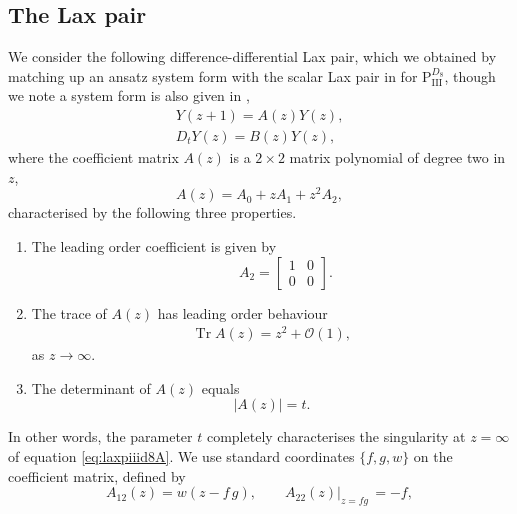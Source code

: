 \documentclass[a4paper,reqno]{amsart}
\numberwithin{equation}{section}
\numberwithin{figure}{section}
\theoremstyle{remark}
\newcommand\Pthree{\textrm{P}_{\textrm{III}}}
\begin{document}
\subsection{The Lax pair} \label{subsect:linP3d8}
We consider the following difference-differential Lax pair, which we obtained by matching up an ansatz system form with the scalar Lax pair in \cite{KNY2017} for $\Pthree^{D_8}$, though we note a system form is also given in \cite[\S 6]{adler94},
\begin{subequations}\label{eq:laxpiiid8}
\begin{align}
    Y(z+1)=A(z)Y(z),\label{eq:laxpiiid8A}\\
    D_t Y(z)=B(z)Y(z),\label{eq:laxpiiid8B}
\end{align}
\end{subequations}
where the coefficient matrix $A(z)$ is a $2\times 2$ matrix polynomial of degree two in $z$,
\begin{equation}\label{eq:piiid8Aseries}
        A(z)=A_0+z A_1+z^2A_2,
    \end{equation}
    characterised by the following three properties.
\begin{enumerate}[label=(\roman*)]
\item The leading order coefficient is given by
\begin{equation*}
    \qquad A_2=\begin{bmatrix}
            1 & 0\\
            0 & 0
        \end{bmatrix}.
\end{equation*}
    \item The trace of $A(z)$ has leading order behaviour
   \begin{equation}\label{eq:traceinfpiiid8}
    \begin{aligned}
     \operatorname{Tr}A(z)=z^2+\mathcal{O}(1),
    \end{aligned}
   \end{equation}
    as $z\rightarrow \infty$.
    \item The determinant of $A(z)$ equals
\begin{equation}\label{eq:coefmatrixdetpiiid8}
    |A(z)|=t.
\end{equation}
\end{enumerate}
In other words, the parameter $t$ completely characterises the singularity at $z=\infty$ of equation \eqref{eq:laxpiiid8A}. We use standard coordinates $\{f,g,w\}$ on the coefficient matrix, defined by 
\begin{equation*}
    A_{12}(z)=w(z-f\,g),\qquad A_{22}(z)|_{z=fg}\,=-f,
\end{equation*}
\end{document}
